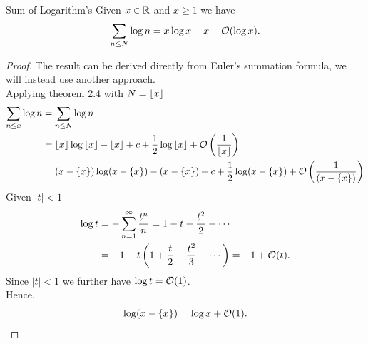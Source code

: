 \documentclass[twoside, openright, fontsize=10pt, headings=big]{scrbook}
\begin{document}
\begin{corollary}{Sum of Logarithm's}{}
    Given $x\in\mathbb{R}$ and $x\geq1$ we have
\[
    \sum_{n\leq N}\log n=x\log x-x+\mathcal{O}(\log x).
\]
\end{corollary}
\begin{proof}
    The result can be derived directly from Euler's summation formula, we will instead use another approach.\\
    Applying theorem 2.4 with $N=\left\lfloor x \right\rfloor$
    \begin{align*}
        \sum_{n\leq x}\log n&=\sum_{n\leq N}\log n\\
        &=\left\lfloor x \right\rfloor\log\left\lfloor x \right\rfloor-\left\lfloor x \right\rfloor+c+\frac{1}{2}\log\left\lfloor x \right\rfloor+\mathcal{O}\left(\frac{1}{\left\lfloor x \right\rfloor}\right)\\
        &=(x-\left\{ x \right\})\log(x-\left\{ x \right\})-(x-\left\{ x \right\})+c+\frac{1}{2}\log(x-\left\{ x \right\})+\mathcal{O}\left(\frac{1}{(x-\left\{ x \right\})}\right)
    \end{align*}
    Given $|t|<1$
    \begin{align*}
        \log t&=-\sum_{n=1}^{\infty}\frac{t^n}{n}=1-t-\frac{t^2}{2}-\cdots\\
        &=-1-t\left(1+\frac{t}{2}+\frac{t^2}{3}+\cdots\right)=-1+\mathcal{O}(t).
    \end{align*}
    Since $|t|<1$ we further have $\log t=\mathcal{O}(1)$.\\
    Hence,
    \[
        \log(x-\left\{ x \right\})=\log x+\mathcal{O}(1).\qedhere
    \]
\end{proof}
\end{document}
